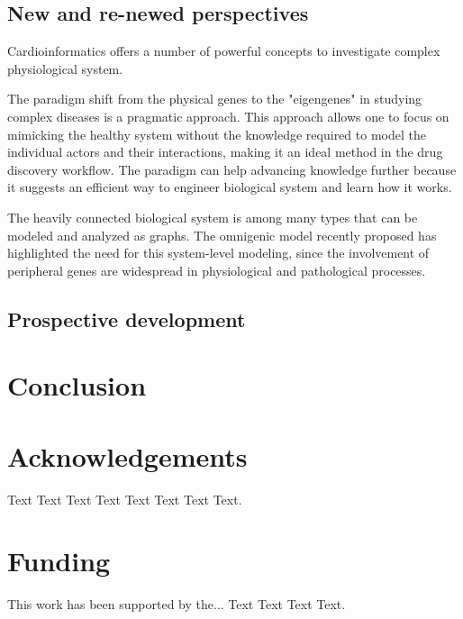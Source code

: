 \documentclass[letter]{bioinfo}
\begin{document}
%
%

\subsection{New and re-newed perspectives}

Cardioinformatics offers a number of powerful concepts to investigate complex physiological system.

The paradigm shift from the physical genes to the "eigengenes" in studying complex diseases \citep{Weiss:2012:Good} is a pragmatic approach. This approach allows one to focus on mimicking the healthy system without the knowledge required to model the individual actors and their interactions, making it an ideal method in the drug discovery workflow. The paradigm can help advancing knowledge further because it suggests an efficient way to engineer biological system and learn how it works.

The heavily connected biological system is among many types that can be modeled and analyzed as graphs. The omnigenic model recently proposed has highlighted the need for this system-level modeling, since the involvement of peripheral genes are widespread in physiological and pathological processes.

\subsection{Prospective development}



\section{Conclusion}


%

\enlargethispage{12pt}




\section*{Acknowledgements}

Text Text Text Text Text Text  Text Text.  
\vspace*{-12pt}

\section*{Funding}

This work has been supported by the... Text Text  Text Text.\vspace*{-12pt}


%
%
%
%
%
%

\end{document}
